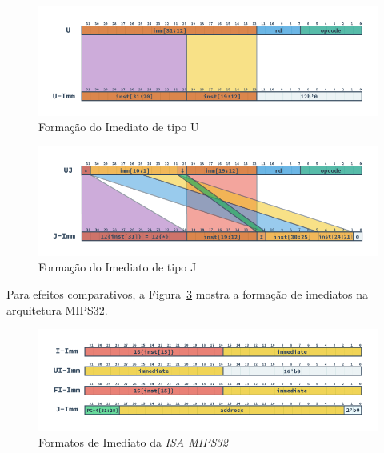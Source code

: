         \begin{figure}[H]
        \centering
            \includegraphics[width=1\linewidth]{../images/RV_U_Imm.png}
            \caption{Formação do Imediato de tipo U
                }\label{fig:riscv_u_imm}
        \end{figure}

        \begin{figure}[H]
        \centering
            \includegraphics[width=1\linewidth]{../images/RV_J_Imm.png}
            \caption{Formação do Imediato de tipo J
                }\label{fig:riscv_j_imm}
        \end{figure}

        {
            Para efeitos comparativos, a Figura~\ref{fig:mips_immediates} mostra a
            formação de imediatos na arquitetura MIPS32.
        }

        \begin{figure}[H]
        \centering
            \includegraphics[width=1\linewidth]{../images/MIPS_Immediates.png}
            \caption{Formatos de Imediato da \textit{ISA MIPS32}}\label{fig:mips_immediates}
        \end{figure}












